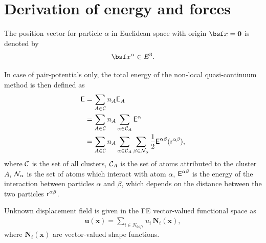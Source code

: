 \documentclass[a4paper,10pt]{article}
\def\gz  #1{           \mbox{$\mathbf{#1}$}}
\def\msf  #1{           \mbox{\!\!      $\sf #1$}}
\def\mcl  #1{               {\cal #1}}
\begin{document}
\section{Derivation of energy and forces}
The position vector for particle $\alpha$ in Euclidean space with origin $\bsf x = \gz 0$ is denoted by
\begin{align}
\bsf x^\alpha \in  E^3.
\end{align}

In case of pair-potentials only, the total energy of the non-local quasi-continuum method is then defined as
\begin{align}
\msf E &= \sum_{A \in \mcl C} n_A \msf E_A \\
           &= \sum_{A \in \mcl C} n_A \sum_{\alpha \in \mcl C_A} \msf E^\alpha \\
           &= \sum_{A \in \mcl C} n_A \sum_{\alpha \in \mcl C_A} \sum_{\beta \in \mcl N_\alpha} \frac{1}{2} \msf E^{\alpha \beta} (\msf r^{\alpha\beta}),
\end{align}
where $\mcl C$ is the set of all clusters, $\mcl C_A$ is the set of atoms attributed to the cluster $A$, $\mcl N_\alpha$ is the set of atoms which interact with atom $\alpha$,
$\msf E^{\alpha \beta}$ is the energy of the interaction between particles $\alpha$ and $\beta$, which depends on the distance between the two particles $\msf r^{\alpha\beta}$.

Unknown displacement field is given in the FE vector-valued functional space as
\begin{align}
\gz u (\gz x) = \sum_{i \in N_{dofs}} u_i \, \gz N_i (\gz x),
\end{align}
where $\gz N_i (\gz x)$ are vector-valued shape functions.
\end{document}
